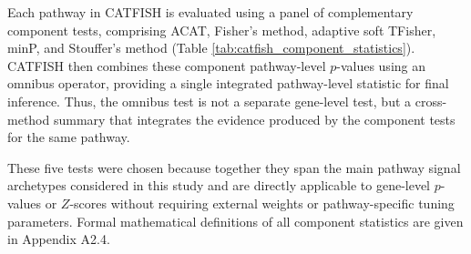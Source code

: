 \documentclass[unnumsec,webpdf,contemporary,large]{oup-authoring-template}%
\theoremstyle{thmstyleone}%
\theoremstyle{thmstyletwo}%
\theoremstyle{thmstylethree}%
\begin{document}
Each pathway in CATFISH is evaluated using a panel of complementary component tests, comprising ACAT, Fisher’s method, adaptive soft TFisher, minP, and Stouffer’s method (Table \ref{tab:catfish_component_statistics}). CATFISH then combines these component pathway-level $p$-values using an omnibus operator, providing a single integrated pathway-level statistic for final inference. Thus, the omnibus test is not a separate gene-level test, but a cross-method summary that integrates the evidence produced by the component tests for the same pathway.

These five tests were chosen because together they span the main pathway signal archetypes considered in this study and are directly applicable to gene-level $p$-values or $Z$-scores without requiring external weights or pathway-specific tuning parameters. Formal mathematical definitions of all component statistics are given in Appendix A2.4.
\end{document}
